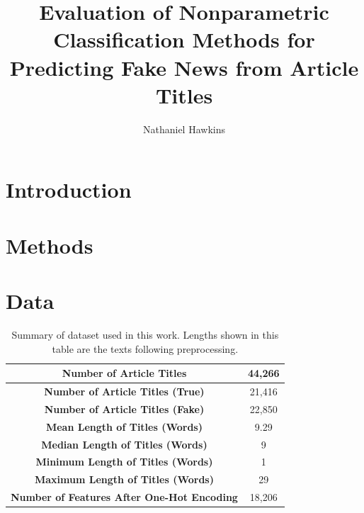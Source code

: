 \documentclass[12pt]{article}
\title{Evaluation of Nonparametric Classification Methods for Predicting Fake News from Article Titles}
\author{Nathaniel Hawkins}
\date{}
\begin{document}
	\maketitle
	
	\section{Introduction}
	
	
	
	\section{Methods}
	
	
	
	\section{Data}

    \begin{table}
    \begin{center}
        \begin{tabular}{|c|c|}
            \hline
            \textbf{Number of Article Titles}&44,266\\
            \hline
            \textbf{Number of Article Titles (True)}&21,416\\
            \hline
            \textbf{Number of Article Titles (Fake)}&22,850\\
            \hline
            \textbf{Mean Length of Titles (Words)}&9.29\\
            \hline
            \textbf{Median Length of Titles (Words)}&9\\
            \hline
            \textbf{Minimum Length of Titles (Words)}&1\\
            \hline
            \textbf{Maximum Length of Titles (Words)}&29\\
            \hline
            \textbf{Number of Features After One-Hot Encoding}&18,206\\
            \hline
        \end{tabular}
        \caption{Summary of dataset used in this work. Lengths shown in this table are the texts following preprocessing.}
        \label{table:1}
    \end{center}  
    \end{table} 	
    
\end{document}
